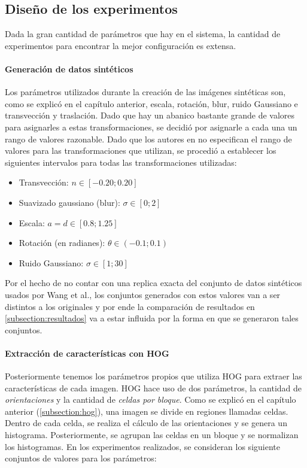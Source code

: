 \subsection{Diseño de los experimentos}

	Dada la gran cantidad de parámetros que hay en el sistema, la cantidad de experimentos para encontrar la mejor configuración es extensa.

        \paragraph{Generación de datos sintéticos}

	Los parámetros utilizados durante la creación de las imágenes sintéticas son, como se explicó en el capítulo anterior, escala, rotación, blur, ruido Gaussiano e transvección y traslación. Dado que hay un abanico bastante grande de valores para asignarles a estas transformaciones, se decidió por asignarle a cada una un rango de valores razonable. Dado que los autores en \cite{wang} no especifican el rango de valores para las transformaciones que utilizan, se procedió a establecer los siguientes intervalos para todas las transformaciones utilizadas:
	
	\begin{itemize}
		\item Transvección: $n \in [-0.20 ; 0.20]$
		\item Suavizado gaussiano (blur): $\sigma \in [0 ; 2]$
		\item Escala: $a=d \in [0.8; 1.25]$
		\item Rotación (en radianes): $\theta \in (-0.1; 0.1)$
		\item Ruido Gaussiano: $\sigma \in [1; 30]$
	\end{itemize}
	
	Por el hecho de no contar con una replica exacta del conjunto de datos sintéticos usados por Wang et al., los conjuntos generados con estos valores van a ser distintos a los originales y por ende la comparación de resultados  en \ref{subsection:resultados} va a estar influida por la forma en que se generaron tales conjuntos.
	
	\paragraph{Extracción de características con HOG}

	Posteriormente tenemos los parámetros propios que utiliza HOG para extraer las características de cada imagen. HOG hace uso de dos parámetros, la cantidad de \textit{orientaciones} y la cantidad de \textit{celdas por bloque}. Como se explicó en el capítulo anterior (\ref{subsection:hog}), una imagen se divide en regiones llamadas celdas. Dentro de cada celda, se realiza el cálculo de las orientaciones y se genera un histograma. Posteriormente, se agrupan las celdas en un bloque y se normalizan los histogramas. En los experimentos realizados, se consideran los siguiente conjuntos de valores para los parámetros:
	
